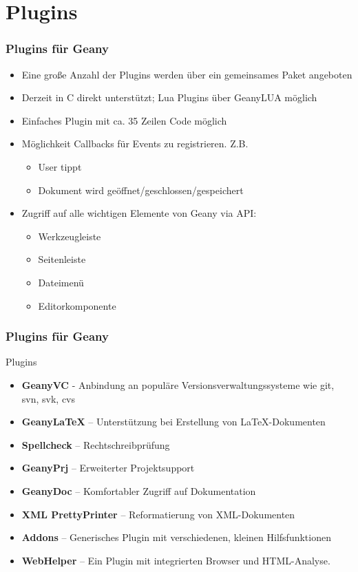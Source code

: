 \section{Plugins}
\begin{frame}
  \frametitle{Plugins für Geany}
  \begin{block}{}
    \begin{itemize}
    \item Eine große Anzahl der Plugins werden über ein gemeinsames
      Paket angeboten
    \item Derzeit in C direkt unterstützt; Lua Plugins über GeanyLUA
      möglich
    \item Einfaches Plugin mit ca. 35 Zeilen Code möglich
    \item Möglichkeit Callbacks für Events zu registrieren. Z.B.
      \begin{itemize}
        \item User tippt
        \item Dokument wird geöffnet/geschlossen/gespeichert
      \end{itemize}
    \item Zugriff auf alle wichtigen Elemente von Geany via API:
      \begin{itemize}
        \item Werkzeugleiste
        \item Seitenleiste
        \item Dateimenü
        \item Editorkomponente
      \end{itemize}
    \end{itemize}
  \end{block}
\end{frame}

\begin{frame}
  \frametitle{Plugins für Geany}
  \begin{block}{Plugins}
    \begin{itemize}
    \item \textbf{GeanyVC} - Anbindung an populäre
        Versions\-ver\-waltungs\-systeme wie git, svn, svk, cvs
    \item \textbf{GeanyLaTeX} -- Unterstützung bei Erstellung von
        \LaTeX-Dokumenten
    \item \textbf{Spellcheck} -- Rechtschreibprüfung
    \item \textbf{GeanyPrj} -- Erweiterter Projektsupport
    \item \textbf{GeanyDoc} -- Komfortabler Zugriff auf Dokumentation
    \item \textbf{XML PrettyPrinter} -- Reformatierung von XML-Dokumenten
    \item \textbf{Addons} -- Generisches Plugin mit verschiedenen, 
          kleinen Hilfsfunktionen
    \item \textbf{WebHelper} -- Ein Plugin mit integrierten Browser
          und HTML-Analyse.
    \end{itemize}
  \end{block}
\end{frame}

